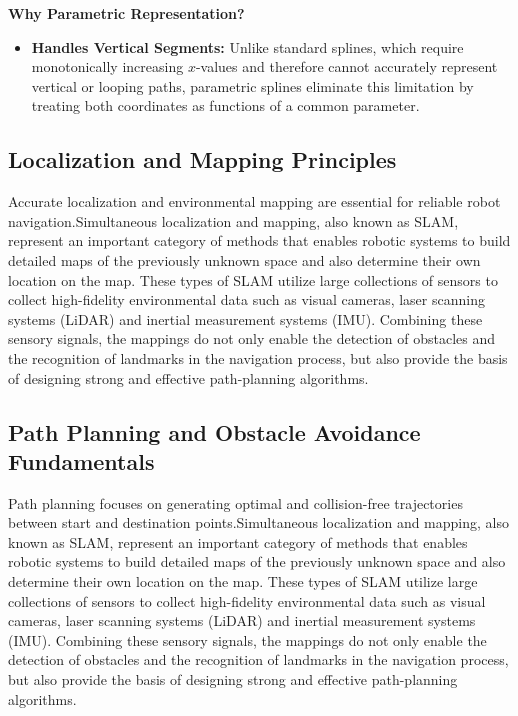\textbf{Why Parametric Representation?}

\begin{itemize}[noitemsep]
\item \textbf{Handles Vertical Segments:} Unlike standard splines, which require monotonically increasing \(x\)-values and therefore cannot accurately represent vertical or looping paths, parametric splines eliminate this limitation by treating both coordinates as functions of a common parameter.
\end{itemize}

\subsection{Localization and Mapping Principles}

Accurate localization and environmental mapping are essential for reliable robot navigation.Simultaneous localization and mapping, also known as SLAM, represent an important category of methods that enables robotic systems to build detailed maps of the previously unknown space and also determine their own location on the map. These types of SLAM utilize large collections of sensors to collect high-fidelity environmental data such as visual cameras, laser scanning systems (LiDAR) and inertial measurement systems (IMU). Combining these sensory signals, the mappings do not only enable the detection of obstacles and the recognition of landmarks in the navigation process, but also provide the basis of designing strong and effective path-planning algorithms.
\subsection{Path Planning and Obstacle Avoidance Fundamentals}

	Path planning focuses on generating optimal and collision-free trajectories between start and destination points.Simultaneous localization and mapping, also known as SLAM, represent an important category of methods that enables robotic systems to build detailed maps of the previously unknown space and also determine their own location on the map. These types of SLAM utilize large collections of sensors to collect high-fidelity environmental data such as visual cameras, laser scanning systems (LiDAR) and inertial measurement systems (IMU). Combining these sensory signals, the mappings do not only enable the detection of obstacles and the recognition of landmarks in the navigation process, but also provide the basis of designing strong and effective path-planning algorithms.

